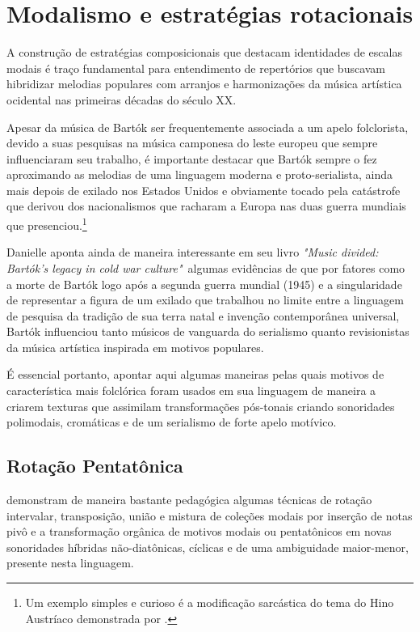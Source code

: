 \documentclass[
	12pt,				%
	openright,			%
	twoside,			%
	a4paper,			%
	english,			%
	french,				%
	spanish,			%
	brazil				%
	]{abntex2}
\begin{document}
\section{Modalismo e estratégias rotacionais}

A construção de estratégias composicionais que destacam identidades de escalas modais é traço fundamental para entendimento de repertórios que buscavam hibridizar melodias populares com arranjos e harmonizações da música artística ocidental nas primeiras décadas do século XX. 

Apesar da música de Bartók ser frequentemente associada a um apelo folclorista, devido a suas pesquisas na música camponesa do leste europeu que sempre influenciaram seu trabalho, é importante destacar que Bartók sempre o fez aproximando as melodias de uma linguagem moderna e proto-serialista, ainda mais depois de exilado nos Estados Unidos e obviamente tocado pela catástrofe que derivou dos nacionalismos que racharam a Europa nas duas guerra mundiais que presenciou.\footnote{Um exemplo simples e curioso é a modificação sarcástica do tema do Hino Austríaco demonstrada por . }

Danielle  aponta ainda de maneira interessante em seu livro \textit{"Music divided: Bartók's legacy in cold war culture"}\ algumas evidências de que por fatores como a morte de Bartók logo após a segunda guerra mundial (1945) e a singularidade de representar a figura de um exilado que trabalhou no limite entre a linguagem de pesquisa da tradição de sua terra natal e invenção contemporânea universal, Bartók influenciou tanto músicos de vanguarda do serialismo quanto revisionistas da música artística inspirada em motivos populares.

É essencial portanto, apontar aqui algumas maneiras pelas quais motivos de característica mais folclórica foram usados em sua linguagem de maneira a criarem texturas que assimilam transformações pós-tonais criando sonoridades polimodais, cromáticas e de um serialismo de forte apelo motívico.


\subsection{Rotação Pentatônica}
 
 demonstram de maneira bastante pedagógica algumas técnicas de rotação intervalar, transposição, união e mistura de coleções modais por inserção de notas pivô e a transformação orgânica de motivos modais ou pentatônicos em novas sonoridades híbridas não-diatônicas, cíclicas e de uma ambiguidade maior-menor, presente nesta linguagem. 
\end{document}
